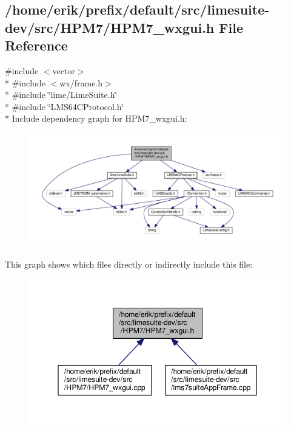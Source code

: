 \subsection{/home/erik/prefix/default/src/limesuite-\/dev/src/\+H\+P\+M7/\+H\+P\+M7\+\_\+wxgui.h File Reference}
\label{HPM7__wxgui_8h}
{\ttfamily \#include $<$vector$>$}\\*
{\ttfamily \#include $<$wx/frame.\+h$>$}\\*
{\ttfamily \#include \char`\"{}lime/\+Lime\+Suite.\+h\char`\"{}}\\*
{\ttfamily \#include \char`\"{}L\+M\+S64\+C\+Protocol.\+h\char`\"{}}\\*
Include dependency graph for H\+P\+M7\+\_\+wxgui.\+h\+:
\nopagebreak
\begin{figure}[H]
\begin{center}
\leavevmode
\includegraphics[width=350pt]{d5/dab/HPM7__wxgui_8h__incl}
\end{center}
\end{figure}
This graph shows which files directly or indirectly include this file\+:
\nopagebreak
\begin{figure}[H]
\begin{center}
\leavevmode
\includegraphics[width=350pt]{df/d0f/HPM7__wxgui_8h__dep__incl}
\end{center}
\end{figure}
